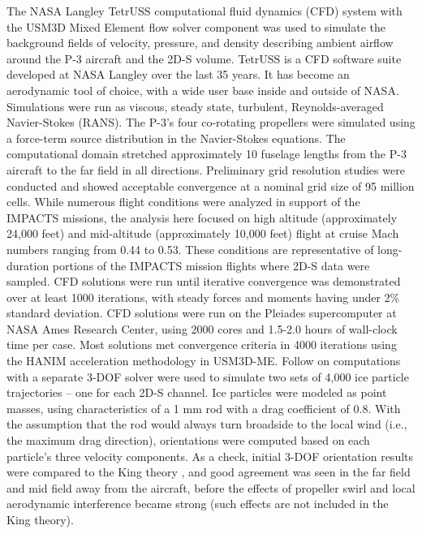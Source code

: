 \documentclass[amt, manuscript]{copernicus}
\begin{document}


The NASA Langley TetrUSS computational fluid dynamics (CFD) system \citep{Frink2000} with the USM3D Mixed Element \citep[USM3D-ME;][]{Pandya2021} flow solver component was used to simulate the background fields of velocity, pressure, and density describing ambient airflow around the P-3 aircraft and the 2D-S volume. TetrUSS is a CFD software suite developed at NASA Langley over the last 35 years. It has become an aerodynamic tool of choice, with a wide user base inside and outside of NASA. Simulations were run as viscous, steady state, turbulent, Reynolds-averaged Navier-Stokes (RANS). The P-3’s four co-rotating propellers were simulated using a force-term source distribution in the Navier-Stokes equations. The computational domain stretched approximately 10 fuselage lengths from the P-3 aircraft to the far field in all directions. Preliminary grid resolution studies were conducted and showed acceptable convergence at a nominal grid size of 95 million cells. While numerous flight conditions were analyzed in support of the IMPACTS missions, the analysis here focused on high altitude (approximately 24,000 feet) and mid-altitude (approximately 10,000 feet) flight at cruise Mach numbers ranging from 0.44 to 0.53.  These conditions are representative of long-duration portions of the IMPACTS mission flights where 2D-S data were sampled. CFD solutions were run until iterative convergence was demonstrated over at least 1000 iterations, with steady forces and moments having under 2\% standard deviation. CFD solutions were run on the Pleiades supercomputer at NASA Ames Research Center, using 2000 cores and 1.5-2.0 hours of wall-clock time per case. Most solutions met convergence criteria in 4000 iterations using the HANIM acceleration methodology in USM3D-ME. Follow on computations with a separate 3-DOF solver were used to simulate two sets of 4,000 ice particle trajectories -- one for each 2D-S channel. Ice particles were modeled as point masses, using characteristics of a 1 mm rod with a drag coefficient of 0.8. With the assumption that the rod would always turn broadside to the local wind (i.e., the maximum drag direction), orientations were computed based on each particle’s three velocity components. As a check, initial 3-DOF orientation results were compared to the King theory \citep{King1985d}, and good agreement was seen in the far field and mid field away from the aircraft, before the effects of propeller swirl and local aerodynamic interference became strong (such effects are not included in the King theory).
\end{document}
